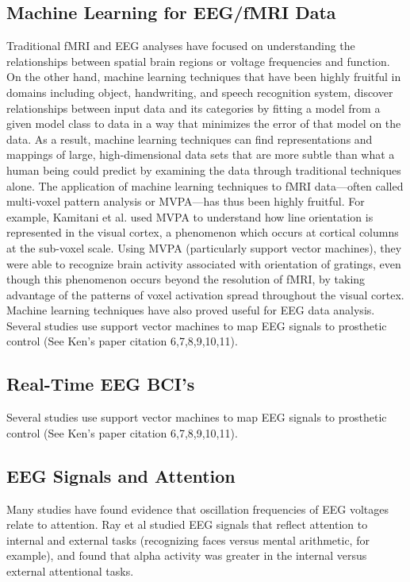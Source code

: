 \documentclass[11pt]{report}
\begin{document}
\subsection{Machine Learning for EEG/fMRI Data}
Traditional fMRI and EEG analyses have focused on understanding the relationships between spatial brain regions or voltage frequencies and function.  On the other hand, machine learning techniques that have been highly fruitful in domains including object, handwriting, and speech recognition system, discover relationships between input data and its categories by fitting a model from a given model class to data in a way that minimizes the error of that model on the data.  As a result, machine learning techniques can find representations and mappings of large, high-dimensional data sets that are more subtle than what a human being could predict by examining the data through traditional techniques alone.  The application of machine learning techniques to fMRI data—often called multi-voxel pattern analysis or MVPA—has thus been highly fruitful\cite{Norman}.  For example, Kamitani et al. \cite{Kamitani} used MVPA to understand how line orientation is represented in the visual cortex, a phenomenon which occurs at cortical columns at the sub-voxel scale.   Using MVPA (particularly support vector machines), they were able to recognize brain activity associated with orientation of gratings, even though this phenomenon occurs beyond the resolution of fMRI, by taking advantage of the patterns of voxel activation spread throughout the visual cortex.  
Machine learning techniques have also proved useful for EEG data analysis.  Several studies use support vector machines to map EEG signals to prosthetic control (See Ken’s paper citation 6,7,8,9,10,11).  

\subsection{Real-Time EEG BCI's}
Several studies use support vector machines to map EEG signals to prosthetic control (See Ken’s paper citation 6,7,8,9,10,11).

\subsection{EEG Signals and Attention}
Many studies have found evidence that oscillation frequencies of EEG voltages relate to attention.  Ray et al\cite{Ray} studied EEG signals that reflect attention to internal and external tasks (recognizing faces versus mental arithmetic, for example), and found that alpha activity was greater in the internal versus external attentional tasks.    
\end{document}
